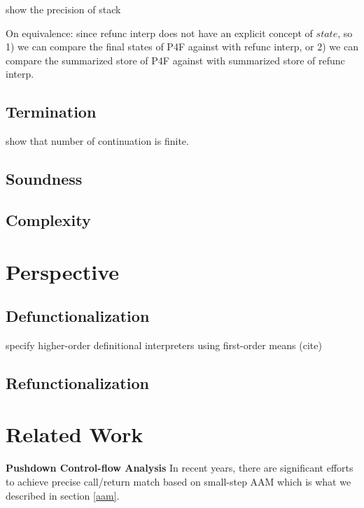 \documentclass[acmsmall,review,anonymous]{acmart}\settopmatter{printfolios=true,printccs=false,printacmref=false}
\begin{document}
show the precision of stack

On equivalence: since refunc interp does not have an explicit concept of $state$,
so 1) we can compare the final states of P4F against with refunc interp,
or 2) we can compare the summarized store of P4F against with summarized store of refunc interp.

\subsection{Termination}

show that number of continuation is finite.

\subsection{Soundness}

\subsection{Complexity}

\section{Perspective}

\subsection{Defunctionalization}

specify higher-order definitional interpreters using first-order means (cite)

\subsection{Refunctionalization}


\section{Related Work}

\textbf{Pushdown Control-flow Analysis}
In recent years, there are significant efforts \cite{vardoulakis2010cfa2, earl2012introspective, 
gilray2016pushdown, johnson2015abstracting} to achieve precise call/return 
match based on small-step AAM which is what we described in section \ref{aam}.
\end{document}
